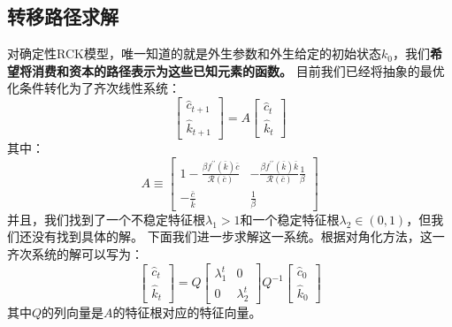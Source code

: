 \subsection{转移路径求解}

对确定性RCK模型，唯一知道的就是外生参数和外生给定的初始状态$k_0$，我们\textbf{希望将消费和资本的路径表示为这些已知元素的函数。}
目前我们已经将抽象的最优化条件转化为了齐次线性系统：
\[
    \begin{bmatrix}
        \hat{c}_{t+1} \\
        \hat{k}_{t+1}
    \end{bmatrix}
    =
    A
    \begin{bmatrix}
        \hat{c}_{t} \\
        \hat{k}_{t}
    \end{bmatrix}
\]
其中：
\[
    A \equiv
    \begin{bmatrix}
        1-\frac{\beta f^{\prime \prime}(\bar{k}) \bar{c}}{\mathcal{R}(\bar{c})} &
        - \frac{\beta f^{\prime \prime}(\bar{k}) \bar{k}}{\mathcal{R}(\bar{c})} \frac{1}{\beta} \\
        -\frac{\bar{c}}{\bar{k}} & \frac{1}{\beta}
    \end{bmatrix}
\]
并且，我们找到了一个不稳定特征根$\lambda_1 > 1$和一个稳定特征根$\lambda_2 \in (0,1)$，但我们还没有找到具体的解。
下面我们进一步求解这一系统。根据对角化方法，这一齐次系统的解可以写为：
\[
    \begin{bmatrix}
        \hat{c}_{t} \\
        \hat{k}_{t}
    \end{bmatrix}
    =
    Q
    \begin{bmatrix}
        \lambda_1^t & 0 \\
        0 & \lambda_2^t
    \end{bmatrix}
    Q^{-1}
    \begin{bmatrix}
        \hat{c}_0 \\
        \hat{k}_0
    \end{bmatrix}
\]
其中$Q$的列向量是$A$的特征根对应的特征向量。

